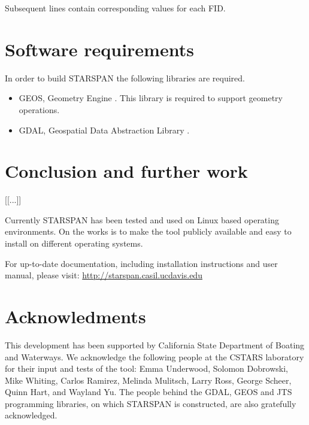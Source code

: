 \documentclass{elsart}
\begin{document}
Subsequent lines contain corresponding values for each FID.

\section{Software requirements}

	In order to build STARSPAN the following libraries are required.
	
	\begin{itemize}
		\item GEOS, Geometry Engine \citep{geos}.
				This library is required to support geometry operations.
				
		\item GDAL, Geospatial Data Abstraction Library \citep{gdal}.
	\end{itemize}



\section{Conclusion and further work}

	[[...]]
	
	Currently STARSPAN has been tested and used on Linux based operating
	environments. On the works is to make the tool publicly available and easy
	to install on different operating systems.


	For up-to-date documentation, including installation instructions and user
	manual, please visit: \url{http://starspan.casil.ucdavis.edu}

\section*{Acknowledments}

This development has been supported by California
State Department of Boating and Waterways. We acknowledge
the following people at the CSTARS laboratory for their
input and tests of the tool: Emma Underwood, Solomon
Dobrowski, Mike Whiting, Carlos Ramirez, Melinda Mulitsch,
Larry Ross, George Scheer, Quinn Hart, and Wayland Yu. The
people behind the GDAL, GEOS and JTS programming
libraries, on which STARSPAN is constructed, are also
gratefully acknowledged.



	


\end{document}
